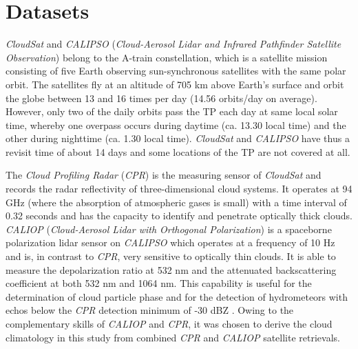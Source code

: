 \documentclass[alpha-refs]{wiley-article}
\begin{document}
\section{Datasets}

\textit{CloudSat} \citep{stephens2002cloudsat} and \textit{CALIPSO} (\textit{Cloud-Aerosol Lidar and Infrared Pathfinder Satellite Observation}) \citep{calipso2009overview_winker} belong to the A-train constellation, which is a satellite mission consisting of five Earth observing sun-synchronous satellites with the same polar orbit. The satellites fly at an altitude of 705 km above Earth’s surface and orbit the globe between 13 and 16 times per day (14.56 orbits/day on average). However, only two of the daily orbits pass the TP each day at same local solar time, whereby one overpass occurs during daytime (ca. 13.30 local time) and the other during nighttime (ca. 1.30 local time). \textit{CloudSat} and \textit{CALIPSO} have thus a revisit time of about 14 days and some locations of the TP are not covered at all.

The \textit{Cloud Profiling Radar} (\textit{CPR}) is the measuring sensor of \textit{CloudSat} and records the radar reflectivity of three-dimensional cloud systems. It operates at 94 GHz (where the absorption of atmospheric gases is small) with a time interval of 0.32 seconds and has the capacity to identify and penetrate optically thick clouds. \textit{CALIOP} (\textit{Cloud-Aerosol Lidar with Orthogonal Polarization}) is a spaceborne polarization lidar sensor on \textit{CALIPSO} which operates at a frequency of 10 Hz and is, in contrast to \textit{CPR}, very sensitive to optically thin clouds. It is able to measure the depolarization ratio at 532 nm and the attenuated backscattering coefficient at both 532 nm and 1064 nm. This capability is useful for the determination of cloud particle phase \citep{caliop_ice2005} and for the detection of hydrometeors with echos below the \textit{CPR} detection minimum of -30 dBZ \citep{stephens2002cloudsat}. Owing to the complementary skills of \textit{CALIOP} and \textit{CPR}, it was chosen to derive the cloud climatology in this study from combined \textit{CPR} and\textit{ CALIOP} satellite retrievals. 
\end{document}
